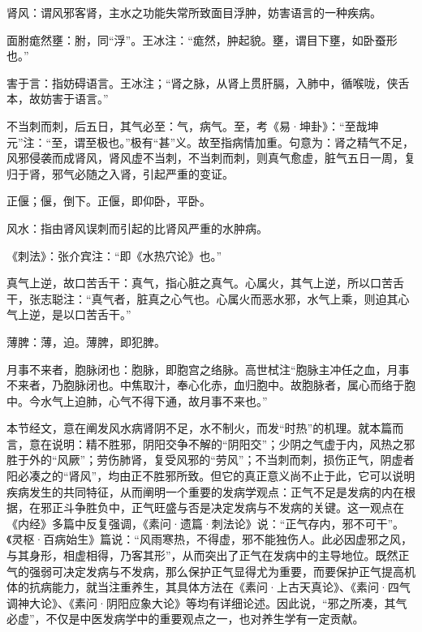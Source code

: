 \documentclass[draft,12pt]{ctexbook}
\begin{document}
\begin{jiaozhu}
  \item 肾风：谓风邪客肾，主水之功能失常所致面目浮肿，妨害语言的一种疾病。
  \item 面胕痝然壅：胕，同“浮”。王冰注：“痝然，肿起貌。壅，谓目下壅，如卧蚕形也。”
  \item 害于言：指妨碍语言。王冰注；“肾之脉，从肾上贯肝膈，入肺中，循喉咙，侠舌本，故妨害于语言。”
  \item 不当刺而刺，后五日，其气必至：气，病气。至，考《易·坤卦》：“至哉坤元”注：“至，谓至极也。”极有“甚”义。故至指病情加重。句意为：肾之精气不足，风邪侵袭而成肾风，肾风虚不当刺，不当刺而刺，则真气愈虚，脏气五日一周，复归于肾，邪气必随之入肾，引起严重的变证。
  \item 正偃；偃，倒下。正偃，即仰卧，平卧。
  \item 风水：指由肾风误刺而引起的比肾风严重的水肿病。
  \item 《刺法》：张介宾注：“即《水热穴论》也。”
  \item 真气上逆，故口苦舌干：真气，指心脏之真气。心属火，其气上逆，所以口苦舌干，张志聪注：“真气者，脏真之心气也。心属火而恶水邪，水气上乘，则迫其心气上逆，是以口苦舌干。”
  \item 薄脾：薄，迫。薄脾，即犯脾。
  \item 月事不来者，胞脉闭也：胞脉，即胞宫之络脉。高世栻注“胞脉主冲任之血，月事不来者，乃胞脉闭也。中焦取汁，奉心化赤，血归胞中。故胞脉者，属心而络于胞中。今水气上迫肺，心气不得下通，故月事不来也。”
\end{jiaozhu}



本节经文，意在阐发风水病肾阴不足，水不制火，而发“时热”的机理。就本篇而言，意在说明：精不胜邪，阴阳交争不解的“阴阳交”；少阴之气虚于内，风热之邪胜于外的“风厥”；劳伤肺肾，复受风邪的“劳风”；不当刺而刺，损伤正气，阴虚者阳必凑之的“肾风”，均由正不胜邪所致。但它的真正意义尚不止于此，它可以说明疾病发生的共同特征，从而阐明一个重要的发病学观点：正气不足是发病的内在根据，在邪正斗争胜负中，正气旺盛与否是决定发病与不发病的关键。这一观点在《内经》多篇中反复强调，《素问·遗篇·刺法论》说：“正气存内，邪不可干”。《灵枢·百病始生》篇说：“风雨寒热，不得虚，邪不能独伤人。此必因虚邪之风，与其身形，相虚相得，乃客其形”，从而突出了正气在发病中的主导地位。既然正气的强弱可决定发病与不发病，那么保护正气显得尤为重要，而要保护正气提高机体的抗病能力，就当注重养生，其具体方法在《素问·上古天真论》、《素问·四气调神大论》、《素问·阴阳应象大论》等均有详细论述。因此说，“邪之所凑，其气必虚”，不仅是中医发病学中的重要观点之一，也对养生学有一定贡献。
\end{document}
